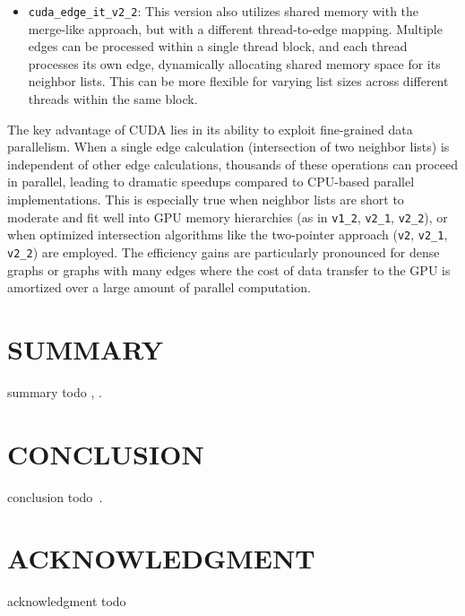 \documentclass{aes2e}
\begin{document}
\begin{itemize}
    \item \texttt{cuda\_edge\_it\_v2\_2}: This version also utilizes shared memory with the merge-like approach, but with a different thread-to-edge mapping. Multiple edges can be processed within a single thread block, and each thread processes its own edge, dynamically allocating shared memory space for its neighbor lists. This can be more flexible for varying list sizes across different threads within the same block.
\end{itemize}

The key advantage of CUDA lies in its ability to exploit fine-grained data parallelism. When a single edge calculation (intersection of two neighbor lists) is independent of other edge calculations, thousands of these operations can proceed in parallel, leading to dramatic speedups compared to CPU-based parallel implementations. This is especially true when neighbor lists are short to moderate and fit well into GPU memory hierarchies (as in \texttt{v1\_2}, \texttt{v2\_1}, \texttt{v2\_2}), or when optimized intersection algorithms like the two-pointer approach (\texttt{v2}, \texttt{v2\_1}, \texttt{v2\_2}) are employed. The efficiency gains are particularly pronounced for dense graphs or graphs with many edges where the cost of data transfer to the GPU is amortized over a large amount of parallel computation.






\section{SUMMARY}
summary todo \cite{DEK3}, \cite{DEK4}.

\section{CONCLUSION}
conclusion todo~\cite{DEK5}.

\section{ACKNOWLEDGMENT}
acknowledgment todo



\end{document}
